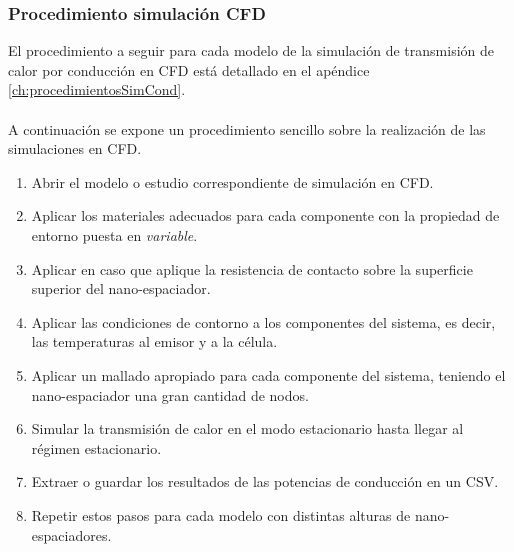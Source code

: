 \subsubsection{Procedimiento simulación CFD}
El procedimiento a seguir para cada modelo de la simulación de transmisión de calor por conducción en CFD está detallado en el apéndice  \ref{ch:procedimientosSimCond}.\\\\ A continuación se expone un procedimiento sencillo sobre la realización de las simulaciones en CFD.
\begin{enumerate}
	\item Abrir el modelo o estudio correspondiente de simulación en CFD.
	\item Aplicar los materiales adecuados para cada componente con la propiedad de entorno puesta en \textit{variable}.
	\item Aplicar en caso que aplique la resistencia de contacto sobre la superficie superior del nano-espaciador.
	\item Aplicar las condiciones de contorno a los componentes del sistema, es decir, las temperaturas al emisor y a la célula.
	\item Aplicar un mallado apropiado para cada componente del sistema, teniendo el nano-espaciador una gran cantidad de nodos.
	\item Simular la transmisión de calor en el modo estacionario hasta llegar al régimen estacionario.
	\item Extraer o guardar los resultados de las potencias de conducción en un CSV.
	\item Repetir estos pasos para cada modelo con distintas alturas de nano-espaciadores.
\end{enumerate}
